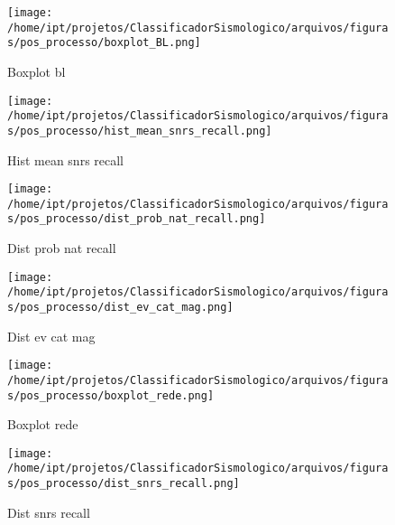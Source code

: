                    \begin{figure}[H]
                        \centering
                        \texttt{[image: /home/ipt/projetos/ClassificadorSismologico/arquivos/figuras/pos\_processo/boxplot\_BL.png]}
                        \caption{Boxplot bl}
                        \label{fig:boxplot_BL}
                    \end{figure}
                

                    \begin{figure}[H]
                        \centering
                        \texttt{[image: /home/ipt/projetos/ClassificadorSismologico/arquivos/figuras/pos\_processo/hist\_mean\_snrs\_recall.png]}
                        \caption{Hist mean snrs recall}
                        \label{fig:hist_mean_snrs_recall}
                    \end{figure}
                

                    \begin{figure}[H]
                        \centering
                        \texttt{[image: /home/ipt/projetos/ClassificadorSismologico/arquivos/figuras/pos\_processo/dist\_prob\_nat\_recall.png]}
                        \caption{Dist prob nat recall}
                        \label{fig:dist_prob_nat_recall}
                    \end{figure}
                

                    \begin{figure}[H]
                        \centering
                        \texttt{[image: /home/ipt/projetos/ClassificadorSismologico/arquivos/figuras/pos\_processo/dist\_ev\_cat\_mag.png]}
                        \caption{Dist ev cat mag}
                        \label{fig:dist_ev_cat_mag}
                    \end{figure}
                

                    \begin{figure}[H]
                        \centering
                        \texttt{[image: /home/ipt/projetos/ClassificadorSismologico/arquivos/figuras/pos\_processo/boxplot\_rede.png]}
                        \caption{Boxplot rede}
                        \label{fig:boxplot_rede}
                    \end{figure}
                

                    \begin{figure}[H]
                        \centering
                        \texttt{[image: /home/ipt/projetos/ClassificadorSismologico/arquivos/figuras/pos\_processo/dist\_snrs\_recall.png]}
                        \caption{Dist snrs recall}
                        \label{fig:dist_snrs_recall}
                    \end{figure}
                

